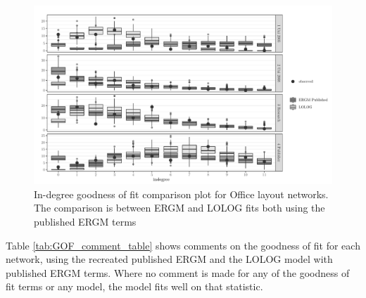\documentclass[
]{statsoc}
\begin{document}
\begin{figure}

{\centering \includegraphics{ERGM_and_LOLOG_performance_real_world_files/figure-latex/unnamed-chunk-6-1} 

}

\caption{\label{fig:sailer_gof_pub_ideg} In-degree goodness of fit comparison plot for Office layout networks. The comparison is between ERGM and LOLOG fits both using the published ERGM terms}\label{fig:unnamed-chunk-6}
\end{figure}

Table \ref{tab:GOF_comment_table} shows comments on the goodness of fit
for each network, using the recreated published ERGM and the LOLOG model
with published ERGM terms. Where no comment is made for any of the
goodness of fit terms or any model, the model fits well on that
statistic.
\end{document}
